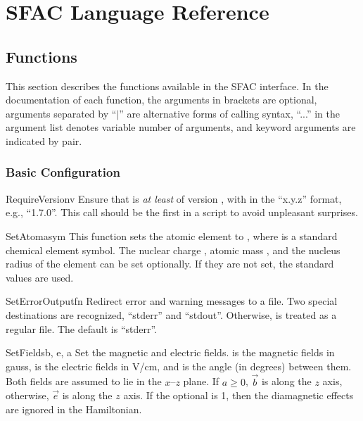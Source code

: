 \chapter{SFAC Language Reference}
\label{cha:function}

\section{Functions}
\label{sec:fac}

This section describes the functions available in the SFAC interface. In the
documentation of each function, the arguments in brackets are optional,
arguments separated by ``$\mid$'' are alternative forms of calling syntax,
``...'' in the argument list denotes variable number of arguments, and keyword
arguments are indicated by  pair.

\subsection{Basic Configuration}

\begin{fundesc}{RequireVersion}{v}
Ensure that \cFAC is {\em at least} of version , with  in the
``x.y.z'' format, e.g., ``1.7.0''. This call should be the first in a script to
avoid unpleasant surprises.
\end{fundesc}

\begin{fundesc}{SetAtom}{asym}
This function sets the atomic element to , where  is a
standard chemical element symbol. The nuclear charge , atomic mass
, and the nucleus radius of the element can be set optionally. If they
are not set, the standard values are used.
\end{fundesc}

\begin{fundesc}{SetErrorOutput}{fn}
Redirect error and warning messages to a file. Two special destinations are
recognized, ``stderr'' and ``stdout''. Otherwise,  is treated as a
regular file. The default is ``stderr''.
\end{fundesc}

\begin{fundesc}{SetFields}{b, e, a}
Set the magnetic and electric fields.  is the magnetic fields in gauss,
 is the electric fields in V/cm, and  is the angle (in degrees)
between them. Both fields are assumed to lie in the $x$--$z$ plane. If $a \ge
0$, $\vec{b}$ is along the $z$ axis, otherwise, $\vec{e}$ is along the $z$ axis.
If the optional  is 1, then the diamagnetic effects are ignored in the
Hamiltonian.
\end{fundesc}


